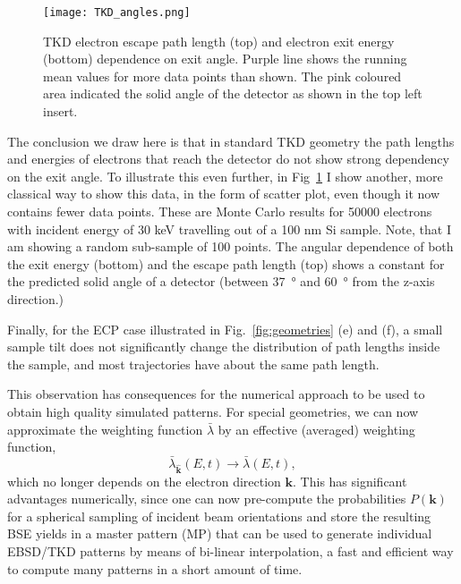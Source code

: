 \begin{figure}[ht]
\centering
\texttt{[image: TKD\_angles.png]}
\caption[Mean angular dependence of exit energies in TKD]{TKD electron escape path length  (top) and electron exit energy (bottom) dependence on exit angle. Purple line shows the running mean values for more data points than shown. The pink coloured area indicated the solid angle of the detector as shown in the top left insert.}
\label{fig:angles}
\end{figure}


The conclusion we draw here is that in standard TKD geometry the path lengths and energies of electrons that reach the detector do not show strong dependency on the exit angle. To illustrate this even further, in Fig~\ref{fig:angles} I show another, more classical way to show this data, in the form of scatter plot, even though it now contains fewer data points. These are Monte Carlo results for 50000 electrons with incident energy of 30 keV travelling out of a 100 nm Si sample. Note, that I am showing a random sub-sample of 100 points. The angular dependence of both the exit energy (bottom) and the escape path length (top) shows a constant for the predicted solid angle of a detector (between \SI{37}{\degree} and \SI{60}{\degree} from the z-axis direction.) 




Finally, for the ECP case illustrated in Fig.~\ref{fig:geometries} (e) and (f), a small sample tilt does not significantly change the distribution of path lengths inside the sample, and most trajectories have about the same path length. 


This observation has consequences for the numerical approach to be used to obtain high quality simulated patterns. For special geometries, we can now approximate the weighting function $\bar{\lambda}$ by an effective (averaged) weighting function,
\begin{equation}
    \bar{\lambda}_{\hat{\mathbf{k}}}(E,t) \rightarrow \bar{\lambda}(E,t),
\end{equation}
which no longer depends on the electron direction $\mathbf{k}$.  This has significant advantages numerically, since one can now pre-compute the probabilities $P(\mathbf{k})$ for a spherical sampling of incident beam orientations and store the resulting BSE yields in a master pattern (MP) that can be used to generate individual EBSD/TKD patterns by means of bi-linear interpolation, a fast and efficient way to compute many patterns in a short amount of time.  

